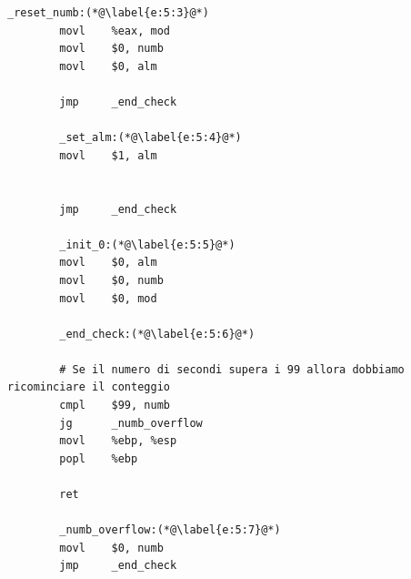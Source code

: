 \documentclass[a4paper,11pt]{article}
\begin{document}
\begin{lstlisting}[language=MyAssembler, style=MyAsm]
		_reset_numb:(*@\label{e:5:3}@*)
		movl    %eax, mod
		movl    $0, numb
		movl    $0, alm
		
		jmp     _end_check
		
		_set_alm:(*@\label{e:5:4}@*)
		movl    $1, alm
		
		
		jmp     _end_check
		
		_init_0:(*@\label{e:5:5}@*)
		movl    $0, alm
		movl    $0, numb
		movl    $0, mod
		
		_end_check:(*@\label{e:5:6}@*)
		
		# Se il numero di secondi supera i 99 allora dobbiamo ricominciare il conteggio
		cmpl    $99, numb
		jg      _numb_overflow
		movl    %ebp, %esp
		popl    %ebp
		
		ret
		
		_numb_overflow:(*@\label{e:5:7}@*)
		movl    $0, numb
		jmp     _end_check
		\end{lstlisting}
		
\end{document}
